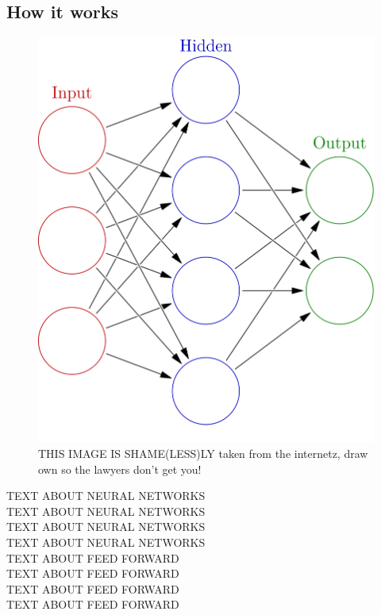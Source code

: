     \subsection{How it works}
	\begin{figure}[ht!]
	    \centering
	    \includegraphics[scale=0.2]{background/figures/neural_network.png}
	    \caption{THIS IMAGE IS SHAME(LESS)LY taken from the internetz, draw own so the lawyers don't get you!}
	\end{figure}
	TEXT ABOUT NEURAL NETWORKS\\
	TEXT ABOUT NEURAL NETWORKS\\
	TEXT ABOUT NEURAL NETWORKS\\
	TEXT ABOUT NEURAL NETWORKS\\

	
	TEXT ABOUT FEED FORWARD\\
	TEXT ABOUT FEED FORWARD\\
	TEXT ABOUT FEED FORWARD\\
	TEXT ABOUT FEED FORWARD\\

